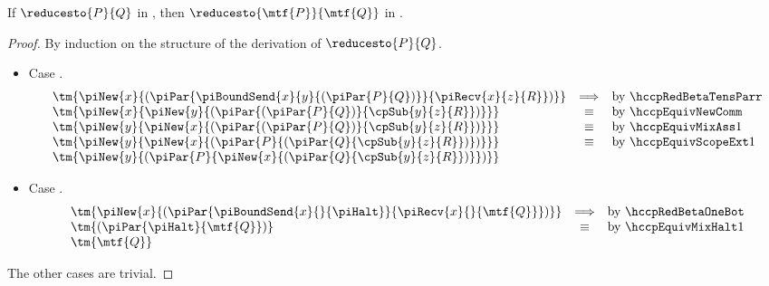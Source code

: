 \begin{theorem}\label{thm:hcp2hccp-reduction}
  If $\reducesto{P}{Q}$ in \hcp, then $\reducesto{\mtf{P}}{\mtf{Q}}$ in \hccp.
\end{theorem}
\begin{proof}
  By induction on the structure of the derivation of $\reducesto{P}{Q}$.
  \begin{itemize}
  \item
    Case \cpRedBetaTensParr.
    \begin{gather*}
      \begin{array}{lcl}
        \tm{\piNew{x}{(\piPar{\piBoundSend{x}{y}{(\piPar{P}{Q})}}{\piRecv{x}{z}{R}})}}
        & \Longrightarrow & \text{by \hccpRedBetaTensParr}
        \\
        \tm{\piNew{x}{\piNew{y}{(\piPar{(\piPar{P}{Q})}{\cpSub{y}{z}{R}})}}}
        & \equiv & \text{by \hccpEquivNewComm}
        \\
        \tm{\piNew{y}{\piNew{x}{(\piPar{(\piPar{P}{Q})}{\cpSub{y}{z}{R}})}}}
        & \equiv & \text{by \hccpEquivMixAss1}
        \\
        \tm{\piNew{y}{\piNew{x}{(\piPar{P}{(\piPar{Q}{\cpSub{y}{z}{R}})})}}}
        & \equiv & \text{by \hccpEquivScopeExt1}
        \\
        \tm{\piNew{y}{(\piPar{P}{\piNew{x}{(\piPar{Q}{\cpSub{y}{z}{R}})}})}}
      \end{array}
    \end{gather*}
  \item
    Case \cpRedBetaOneBot.
    \begin{gather*}
      \begin{array}{lcl}
        \tm{\piNew{x}{(\piPar{\piBoundSend{x}{}{\piHalt}}{\piRecv{x}{}{\mtf{Q}}})}}
        & \Longrightarrow & \text{by \hccpRedBetaOneBot}
        \\
        \tm{(\piPar{\piHalt}{\mtf{Q}})}
        & \equiv & \text{by \hccpEquivMixHalt1}
        \\
        \tm{\mtf{Q}}
      \end{array}
    \end{gather*}
  \end{itemize}
  The other cases are trivial.
\end{proof}
